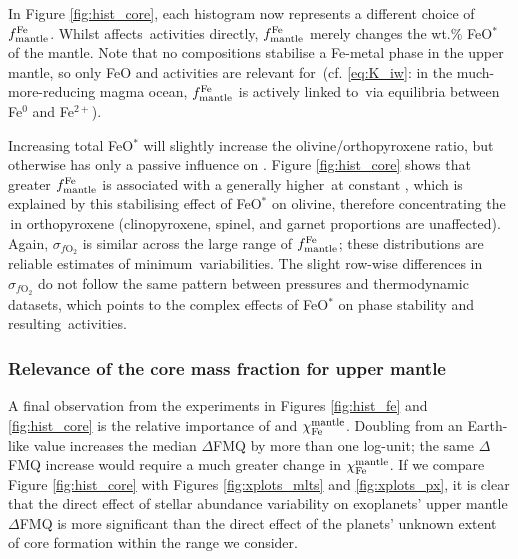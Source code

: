 In Figure \ref{fig:hist_core}, each histogram now represents a different choice of $f^{\rm Fe}_{\rm mantle}$. Whilst \xfer\;affects \ferric\,activities directly, $f^{\rm Fe}_{\rm mantle}$ merely changes the wt.\% FeO$^*$ of the mantle. Note that no compositions stabilise a Fe-metal phase in the upper mantle, so only FeO and  activities are relevant for \fo\,(cf. \eqref{eq:K_iw}: in the much-more-reducing magma ocean, $f^{\rm Fe}_{\rm mantle}$ is actively linked to \fo\,via equilibria between Fe$^0$ and Fe$^{2+}$). 

Increasing total FeO$^*$ will slightly increase the olivine/orthopyroxene ratio, but otherwise has only a passive influence on \fo. Figure \ref{fig:hist_core} shows that greater $f^{\rm Fe}_{\rm mantle}$ is associated with a generally higher \fo\,at constant \xfer, which is explained by this stabilising effect of FeO$^*$ on olivine, therefore concentrating the \ferric\,in orthopyroxene (clinopyroxene, spinel, and garnet proportions are unaffected). Again, $\sigma_{f\text{O}_2}$ is similar across the large range of $f^{\rm Fe}_{\rm mantle}$; these distributions are reliable estimates of minimum \fo\,variabilities. The slight row-wise differences in $\sigma_{f\text{O}_2}$ do not follow the same pattern between pressures and thermodynamic datasets, which points to the complex effects of FeO$^*$ on phase stability and resulting \ferric\,activities.%






\subsubsection{Relevance of the core mass fraction for upper mantle \fo}

A final observation from the experiments in Figures \ref{fig:hist_fe} and \ref{fig:hist_core} is the relative importance of \xfer\;and $\chi_{\rm Fe}^{\rm mantle}$. Doubling \xfer\;from an Earth-like value increases the median $\Delta$FMQ by more than one log-unit; the same $\Delta$FMQ increase would require a much greater change in $\chi_{\rm Fe}^{\rm mantle}$. If we compare Figure \ref{fig:hist_core} with Figures \ref{fig:xplots_mlts} and \ref{fig:xplots_px}, it is clear that the direct effect of stellar abundance variability on exoplanets' upper mantle $\Delta$FMQ is more significant than the direct effect of the planets' unknown extent of core formation within the range we consider.

